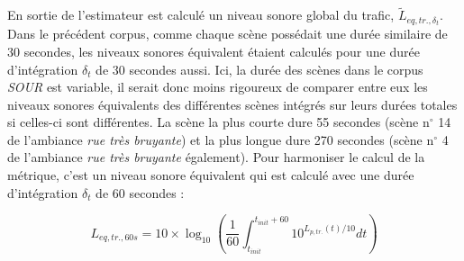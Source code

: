 \begin{table}[t]




\label{tab:experimental_factorsNMF}
\end{table}

 
En sortie de l'estimateur est calculé un niveau sonore global du trafic, $\tilde{L}_{eq,tr.,\delta_t}$. Dans le précédent corpus, comme chaque scène possédait une durée similaire de 30 secondes, les niveaux sonores équivalent étaient calculés pour une durée d'intégration $\delta_t$ de 30 secondes aussi. Ici, la durée des scènes dans le corpus \textit{SOUR} est variable, il serait donc moins rigoureux de comparer entre eux les niveaux sonores équivalents des différentes scènes intégrés sur leurs durées totales si celles-ci sont différentes. La scène la plus courte dure 55 secondes (scène n$^{\circ}$ 14 de l'ambiance \textit{rue très bruyante}) et la plus longue dure 270 secondes (scène n$^{\circ}$ 4 de l'ambiance \textit{rue très bruyante} également). Pour harmoniser le calcul de la métrique, c'est un niveau sonore équivalent qui est calculé avec une durée d'intégration $\delta_t$ de 60 secondes : 

\begin{equation}
L_{eq,tr.,60s} = 10 \times \log_{10}\left(\frac{1}{60}\int_{t_{init}}^{t_{init}+60} 10^{L_{p,tr.}(t)/10} dt\right)
\end{equation}

